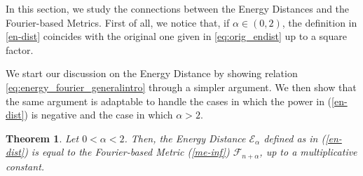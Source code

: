 \documentclass{article}
\newcommand{\fer}[1]{(\ref{#1})}
\newtheorem{theorem}{Theorem}
\begin{document}
% 
In this section, we study the connections between the Energy Distances and the Fourier-based Metrics.
% 
First of all, we notice that, if $\alpha\in(0,2)$, the definition in \eqref{en-dist} coincides with the original one given in \eqref{eq:orig_endist} up to a square factor.
% 

% 
We start our discussion on the Energy Distance by showing relation \eqref{eq:energy_fourier_generalintro} through a simpler argument.
% 
We then show that the same argument is adaptable to handle the cases in which the power in \fer{en-dist} is negative and the case in which $\alpha>2$.
% 




\begin{theorem}
\label{thm:positive_energy} 
Let $0<\alpha<2$. Then, the Energy Distance $\mathcal{E}_\alpha$ defined as in \fer{en-dist} is equal to the Fourier-based Metric \fer{me-inf} $\mathcal{F}_{n+\alpha}$, up to a multiplicative constant.
\end{theorem}
\end{document}
